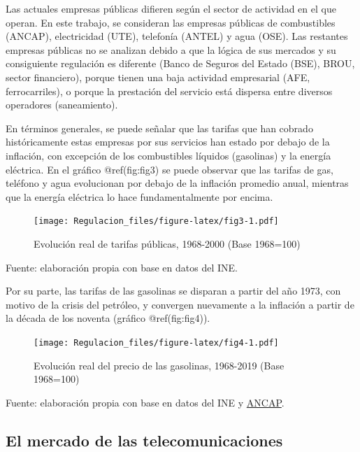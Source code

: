 \documentclass[
  12pt,
  spanish,
]{book}
\begin{document}
Las actuales empresas públicas difieren según el sector de actividad en
el que operan. En este trabajo, se consideran las empresas públicas de
combustibles (ANCAP), electricidad (UTE), telefonía (ANTEL) y agua
(OSE). Las restantes empresas públicas no se analizan debido a que la
lógica de sus mercados y su consiguiente regulación es diferente (Banco
de Seguros del Estado (BSE), BROU, sector financiero), porque tienen una
baja actividad empresarial (AFE, ferrocarriles), o porque la prestación
del servicio está dispersa entre diversos operadores (saneamiento).

En términos generales, se puede señalar que las tarifas que han cobrado
históricamente estas empresas por sus servicios han estado por debajo de
la inflación, con excepción de los combustibles líquidos (gasolinas) y
la energía eléctrica. En el gráfico @ref(fig:fig3) se puede observar que
las tarifas de gas, teléfono y agua evolucionan por debajo de la
inflación promedio anual, mientras que la energía eléctrica lo hace
fundamentalmente por encima.

\begin{figure}
\centering
\texttt{[image: Regulacion\_files/figure-latex/fig3-1.pdf]}
\caption{Evolución real de tarifas públicas, 1968-2000 (Base 1968=100)}
\end{figure}

Fuente: elaboración propia con base en datos del INE.

Por su parte, las tarifas de las gasolinas se disparan a partir del año
1973, con motivo de la crisis del petróleo, y convergen nuevamente a la
inflación a partir de la década de los noventa (gráfico
@ref(fig:fig4)).\\

\begin{figure}
\centering
\texttt{[image: Regulacion\_files/figure-latex/fig4-1.pdf]}
\caption{Evolución real del precio de las gasolinas, 1968-2019 (Base
1968=100)}
\end{figure}

Fuente: elaboración propia con base en datos del INE y
\href{https://www.ancap.com.uy/innovaportal/v/6088/1/innova.front/historico-precio-combustibles.html}{ANCAP}.

\hypertarget{el-mercado-de-las-telecomunicaciones}{%
\subsection{El mercado de las
telecomunicaciones}\label{el-mercado-de-las-telecomunicaciones}}
\end{document}
